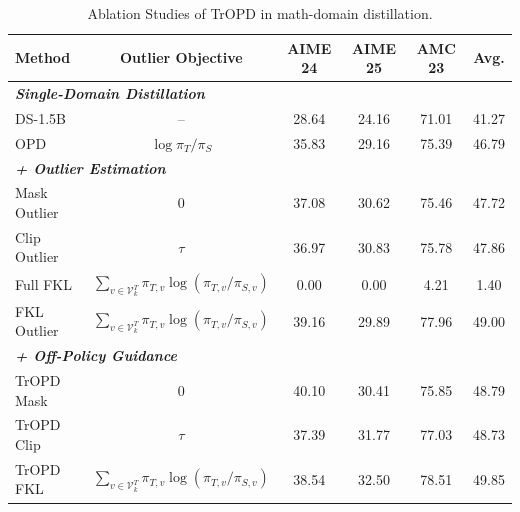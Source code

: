 \documentclass{article} %
\begin{document}
\begin{table}[t]
\centering
\small
\setlength{\tabcolsep}{6pt}
\renewcommand{\arraystretch}{1.1}
\begin{tabular}{lccccc}
\toprule
Method & Outlier Objective & AIME 24 & AIME 25 & AMC 23 & Avg. \\
\midrule
\multicolumn{3}{l}{\emph{\quad \textbf{Single-Domain Distillation}}} \\
DS-1.5B            & -- & 28.64 & 24.16 & 71.01 & 41.27 \\
OPD                & $\log \pi_{T}/\pi_{S}$
                   & 35.83 & 29.16 & 75.39 & 46.79 \\
\midrule
\multicolumn{3}{l}{\emph{\quad \textbf{+ Outlier Estimation}}} \\ 
Mask Outlier       & 0  & 37.08 & 30.62 & 75.46 & 47.72 \\
Clip Outlier       & $\tau$ & 36.97 & 30.83 & 75.78 & 47.86 \\
Full FKL           & $\sum_{v \in \mathcal{V}^{T}_{k}} \pi_{T,v} \log (\pi_{T,v}/\pi_{S,v})$ 
                   & 0.00  & 0.00  & 4.21  & 1.40  \\
\rowcolor{lightpurple} FKL Outlier 
                   & $\sum_{v \in \mathcal{V}^{T}_{k}} \pi_{T,v} \log (\pi_{T,v}/\pi_{S,v})$ 
                   & 39.16 & 29.89 & 77.96 & 49.00 \\
\midrule
\multicolumn{3}{l}{\emph{\quad \textbf{+ Off-Policy Guidance}}} \\ 
TrOPD Mask         & 0 & 40.10 & 30.41 & 75.85 & 48.79 \\
TrOPD Clip         & $\tau$ & 37.39 & 31.77 & 77.03 & 48.73 \\
\rowcolor{lightpurple} TrOPD FKL 
                   & $\sum_{v \in \mathcal{V}^{T}_{k}} \pi_{T,v} \log (\pi_{T,v}/\pi_{S,v})$ 
                   & 38.54 & 32.50 & 78.51 & 49.85 \\
\bottomrule
\end{tabular}%
\caption{Ablation Studies of TrOPD in math-domain distillation.}
\vskip -0.1in 
\label{tab:ablation}
\end{table}
\end{document}
